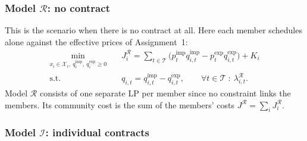 \subsubsection{Model $\mathcal{R}$: no contract}

This is the scenario when there is no contract at all. Here each member schedules alone against the effective prices of Assignment~1:
\begin{subequations}\label{eq:R}
\begin{align}
\min_{x_i\in\mathcal{X}_i,\ q^{\mathrm{imp}}_{i},\ q^{\mathrm{exp}}_{i}\ge 0}\quad & J^{\mathcal{R}}_i=\sum_{t\in\mathcal{T}}\Big(p^{\mathrm{imp}}_t q^{\mathrm{imp}}_{i,t}-p^{\mathrm{exp}}_t q^{\mathrm{exp}}_{i,t}\Big)+K_i \label{eq:R_obj}\\
\text{s.t.}\quad & q_{i,t}=q^{\mathrm{imp}}_{i,t}-q^{\mathrm{exp}}_{i,t}, \qquad \forall t\in\mathcal{T}\ :\ \lambda^{\mathcal{R}}_{i,t}. \label{eq:R_bal}
\end{align}
\end{subequations}
Model $\mathcal{R}$ consists of one separate LP per member since no constraint links the members.
Its community cost is the sum of the members' costs $J^{\mathcal{R}}=\sum_i J^{\mathcal{R}}_i$.


\subsubsection{Model $\mathcal{I}$: individual contracts}

